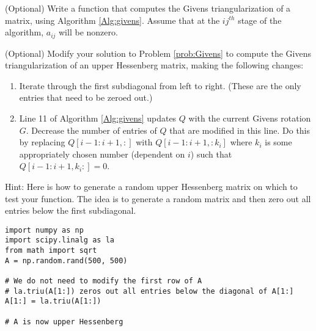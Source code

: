 \begin{problem}
\label{prob:Givens}
(Optional)
Write a function that computes the Givens triangularization of a matrix, using Algorithm \ref{Alg:givens}. 
Assume that at the $ij^{th}$ stage of the algorithm, $a_{ij}$ will be nonzero.
\end{problem}


\begin{problem}
\label{prob:givens_hessenberg}
(Optional)
Modify your solution to Problem \ref{prob:Givens} to compute the Givens triangularization of an upper Hessenberg matrix, making the following changes:
\begin{enumerate}
\item Iterate through the first subdiagonal from left to right. (These are the only entries that need to be zeroed out.)
\item Line 11 of Algorithm \ref{Alg:givens} updates $Q$ with the current Givens rotation $G$. Decrease the number of entries of $Q$ that are modified in this line. Do this by replacing $Q[i-1:i+1, :]$ with $Q[i-1:i+1, :k_i]$ where $k_i$ is some appropriately chosen number (dependent on $i$) such that $Q[i-1:i+1, k_i:]=0$.
\end{enumerate}
Hint: Here is how to generate a random upper Hessenberg matrix on which to test your function.
The idea is to generate a random matrix and then zero out all entries below the first subdiagonal.
\begin{lstlisting}
import numpy as np
import scipy.linalg as la
from math import sqrt
A = np.random.rand(500, 500)

# We do not need to modify the first row of A
# la.triu(A[1:]) zeros out all entries below the diagonal of A[1:]
A[1:] = la.triu(A[1:])

# A is now upper Hessenberg
\end{lstlisting}

\begin{comment}
What is the computational order of  complexity for this problem?
Approximately for what $m$ is your implementation as fast as the general QR decomposition built in to \li{scipy.linalg} for computing the QR decomposition of an upper Hessenberg matrix?
\end{comment}
\end{problem}

